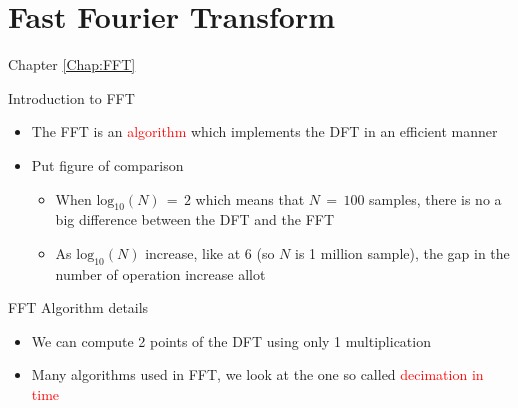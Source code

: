 \section{Fast Fourier Transform}
\label{Chap:FFT}
\begin{frame}[t]{Chapter \autoref{Chap:FFT}}
\tableofcontents[sections= \value{section}]
\end{frame}

\begin{frame}[t,allowframebreaks]{Introduction to FFT}

\begin{itemize}

\item The FFT is an \textcolor{red}{algorithm} which implements the DFT in an efficient manner


\item Put figure of comparison

	\begin{itemize}
	\item When $\text{log}_{10}(N) \, = \, 2$ which means that $N \, = \, 100$ samples, there is no a big difference between the DFT and the FFT
	
	\item As $\text{log}_{10}(N)$ increase, like at 6 (so $N$ is 1 million sample), the gap in the number of operation increase allot 
	\end{itemize}

\end{itemize}


\end{frame}

\begin{frame}[t,allowframebreaks]{FFT Algorithm details}

\begin{itemize}

\item We can compute 2 points of the DFT using only 1 multiplication

\item Many algorithms used in FFT, we look at the one so called \textcolor{red}{decimation in time}


\end{itemize}


\end{frame}
